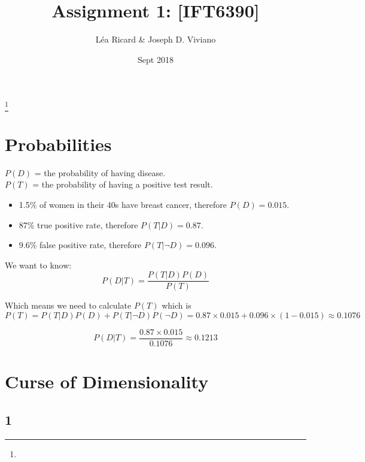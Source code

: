 \documentclass{amsart}
\theoremstyle{definition}
\theoremstyle{remark}
\numberwithin{equation}{section}
\begin{document}
\title{Assignment 1: [IFT6390]}

\author{L\'ea Ricard \& Joseph D. Viviano}
\address{Universit\'e de Montr\'eal}
\curraddr{}
\thanks{}
\date{Sept 2018}

\maketitle

\section{Probabilities}

$P(D)$ = the probability of having disease. \\
$P(T)$ = the probability of having a positive test result. \\

\begin{itemize}
    \item 1.5\% of women in their 40s have breast cancer, therefore $P(D) = 0.015$.
    \item 87\% true positive rate, therefore $P(T|D) = 0.87$.
    \item 9.6\% false positive rate, therefore $P(T|\neg D) = 0.096$.
\end{itemize}

We want to know: \\

\begin{equation}
P(D|T) = \frac{P(T|D) P(D)}{P(T)}
\end{equation}

Which means we need to calculate $P(T)$ which is \\

\begin{equation}
   P(T) = P(T|D)P(D) + P(T |\neg D)P(\neg D) 
        = 0.87 \times 0.015 + 0.096 \times (1-0.015) 
        \approx 0.1076 
\end{equation}

\begin{equation}
    P(D|T) = \frac{0.87 \times 0.015}{0.1076} \approx 0.1213
\end{equation}

\section{Curse of Dimensionality}

\subsection{1} 
\end{document}
